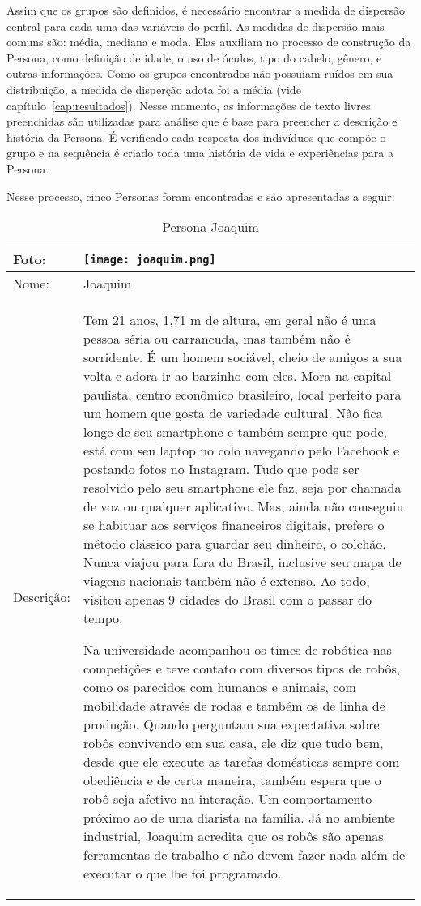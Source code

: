 Assim que os grupos são definidos, é necessário encontrar a medida de dispersão central para cada uma das variáveis do perfil. As medidas de dispersão mais comuns são: média, mediana e moda. Elas auxiliam no processo de construção da Persona, como definição de idade, o uso de óculos, tipo do cabelo, gênero, e outras informações. Como os grupos encontrados não possuiam ruídos em sua distribuição, a medida de disperção adota foi a média (vide capítulo~\ref{cap:resultados}). Nesse momento, as informações de texto livres preenchidas são utilizadas para análise que é base para preencher a descrição e história da Persona. É verificado cada resposta dos indivíduos que compõe o grupo e na sequência é criado toda uma história de vida e experiências para a Persona.

Nesse processo, cinco Personas foram encontradas e são apresentadas a seguir:
\begin{table}[!ht]
	\caption{Persona Joaquim}
	\label{tab:joaquim}
	\centering
	\begin{tabular}{ m{2 cm} | m{13cm} }
		\hline
		Foto: & \rule{0cm}{2.7cm} \texttt{[image: joaquim.png]} \\
		\hline
		Nome: & Joaquim \\
		\hline
		Descrição: & Tem 21 anos, 1,71 m de altura, em geral não é uma pessoa séria ou carrancuda, mas também não é sorridente. É um homem sociável, cheio de amigos a sua volta e adora ir ao barzinho com eles. Mora na capital paulista, centro econômico brasileiro, local perfeito para um homem que gosta de variedade cultural. Não fica longe de seu smartphone e também sempre que pode, está com seu laptop no colo navegando pelo Facebook e postando fotos no Instagram. Tudo que pode ser resolvido pelo seu smartphone ele faz, seja por chamada de voz ou qualquer aplicativo. Mas, ainda não conseguiu se habituar aos serviços financeiros digitais, prefere o método clássico para guardar seu dinheiro, o colchão. Nunca viajou para fora do Brasil, inclusive seu mapa de viagens nacionais também não é extenso. Ao todo, visitou apenas 9 cidades do Brasil com o passar do tempo.

		Na universidade acompanhou os times de robótica nas competições e teve contato com diversos tipos de robôs, como os parecidos com humanos e animais, com mobilidade através de rodas e também os de linha de produção. Quando perguntam sua expectativa sobre robôs convivendo em sua casa, ele diz que tudo bem, desde que ele execute as tarefas domésticas sempre com obediência e de certa maneira, também espera que o robô seja afetivo na interação. Um comportamento próximo ao de uma diarista na família. Já no ambiente industrial, Joaquim acredita que os robôs são apenas ferramentas de trabalho e não devem fazer nada além de executar o que lhe foi programado. \\
		\hline
	\end{tabular}
\end{table}

